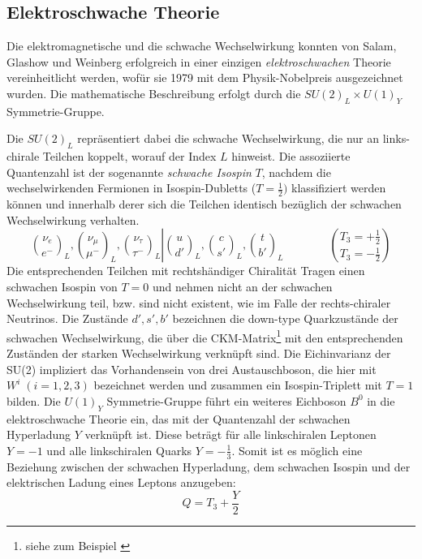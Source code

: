 \subsection{Elektroschwache Theorie}
\label{theory:electroweak}
Die elektromagnetische und die schwache Wechselwirkung konnten von Salam,
Glashow und Weinberg erfolgreich in einer einzigen
\textit{elektroschwachen} Theorie vereinheitlicht werden, wofür sie 1979 mit
dem Physik-Nobelpreis ausgezeichnet wurden. Die mathematische Beschreibung
erfolgt durch die $SU(2)_L \times U(1)_Y$ Symmetrie-Gruppe.

Die $SU(2)_L$ repräsentiert dabei die schwache Wechselwirkung, die nur an
links-chirale Teilchen koppelt, worauf der Index $L$ hinweist. Die assoziierte
Quantenzahl ist der sogenannte \textit{schwache Isospin} $T$, nachdem die
wechselwirkenden Fermionen in Isospin-Dubletts ($T=\frac{1}{2})$ klassifiziert
werden können und innerhalb derer sich die Teilchen identisch bezüglich der
schwachen Wechselwirkung verhalten.
\begin{equation*}
    \left.
    \binom{\nu_e}{e^-}_L , \binom{\nu_\mu}{\mu^-}_L ,
    \binom{\nu_\tau}{\tau^-}_L
    \right|
    \binom{u}{d'}_L , \binom{c}{s'}_L , \binom{t}{b'}_L 
    \qquad\qquad
    \binom{T_3 = +\frac{1}{2}}{T_3 = -\frac{1}{2}}
\end{equation*}
Die entsprechenden Teilchen mit rechtshändiger Chiralität Tragen einen
schwachen Isospin von $T=0$ und nehmen nicht an der schwachen Wechselwirkung
teil, bzw. sind nicht existent, wie im Falle der rechts-chiraler Neutrinos. Die
Zustände $d',s',b'$ bezeichnen die down-type Quarkzustände der schwachen
Wechselwirkung, die über die CKM-Matrix\footnote{siehe zum Beispiel 
\cite{PhysRevD.86.010001}} mit den entsprechenden Zuständen der starken
Wechselwirkung verknüpft sind. Die Eichinvarianz der SU(2) impliziert das
Vorhandensein von drei Austauschboson, die hier mit $W^i\; (i=1,2,3)$
bezeichnet werden und zusammen ein Isospin-Triplett mit $T=1$ bilden. Die
$U(1)_Y$ Symmetrie-Gruppe führt ein weiteres Eichboson $B^0$ in die
elektroschwache Theorie ein, das mit der Quantenzahl der schwachen Hyperladung
$Y$ verknüpft ist. Diese beträgt für alle linkschiralen Leptonen $Y=-1$ und
alle linkschiralen Quarks $Y=-\frac{1}{3}$. Somit ist es möglich eine Beziehung
zwischen der schwachen Hyperladung, dem schwachen Isospin und der elektrischen
Ladung eines Leptons anzugeben:
\begin{equation}
    Q = T_3 + \frac{Y}{2}
\end{equation}

